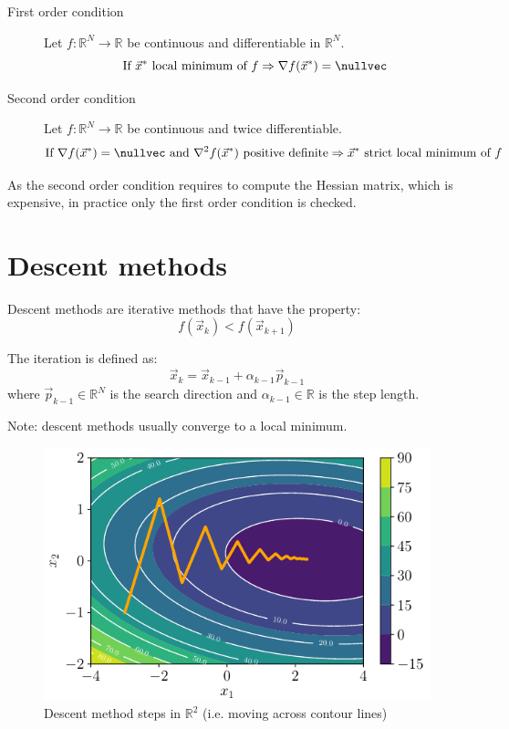 \begin{description}
    \item[First order condition] 
        Let $f: \mathbb{R}^N \rightarrow \mathbb{R}$ be continuous and differentiable in $\mathbb{R}^N$.
        \[ \text{If } \vec{x}^* \text{ local minimum of } f \Rightarrow \nabla f(\vec{x}^*) = \nullvec \]

    \item[Second order condition] 
        Let $f: \mathbb{R}^N \rightarrow \mathbb{R}$ be continuous and twice differentiable.
        \[ 
            \text{If } \nabla f(\vec{x}^*) = \nullvec \text{ and } \nabla^2 f(\vec{x}^*) \text{ positive definite} \Rightarrow 
            \vec{x}^* \text{ strict local minimum of } f 
        \]
\end{description}

As the second order condition requires to compute the Hessian matrix, which is expensive, in practice only the first order condition is checked.



\section{Descent methods}

Descent methods are iterative methods that have the property:
\[ f(\vec{x}_k) < f(\vec{x}_{k+1}) \]

The iteration is defined as:
\[ \vec{x}_k = \vec{x}_{k-1} + \alpha_{k-1}\vec{p}_{k-1} \]
where $\vec{p}_{k-1} \in \mathbb{R}^N$ is the search direction and 
$\alpha_{k-1} \in \mathbb{R}$ is the step length.

Note: descent methods usually converge to a local minimum.

\begin{figure}
    \centering
    \includegraphics[width=0.5\linewidth]{img/_gradient_contour.pdf}
    \caption{Descent method steps in $\mathbb{R}^2$ (i.e. moving across contour lines)}
\end{figure}


